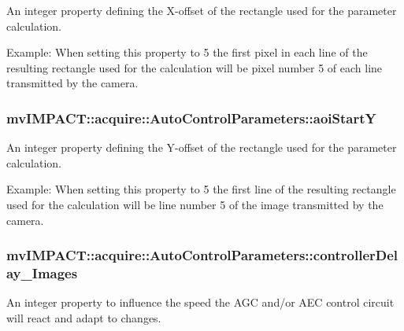 An integer property defining the X-\/offset of the rectangle used for the parameter calculation. 

Example\+: When setting this property to 5 the first pixel in each line of the resulting rectangle used for the calculation will be pixel number 5 of each line transmitted by the camera. \hypertarget{classmv_i_m_p_a_c_t_1_1acquire_1_1_auto_control_parameters_a58ded333b56e13a9924c20162556502c}{
\subsubsection[{aoi\+Start\+Y}]{ mv\+I\+M\+P\+A\+C\+T\+::acquire\+::\+Auto\+Control\+Parameters\+::aoi\+Start\+Y}}\label{classmv_i_m_p_a_c_t_1_1acquire_1_1_auto_control_parameters_a58ded333b56e13a9924c20162556502c}


An integer property defining the Y-\/offset of the rectangle used for the parameter calculation. 

Example\+: When setting this property to 5 the first line of the resulting rectangle used for the calculation will be line number 5 of the image transmitted by the camera. \hypertarget{classmv_i_m_p_a_c_t_1_1acquire_1_1_auto_control_parameters_a3407e03e305679114b266795ad777235}{
\subsubsection[{controller\+Delay\+\_\+\+Images}]{ mv\+I\+M\+P\+A\+C\+T\+::acquire\+::\+Auto\+Control\+Parameters\+::controller\+Delay\+\_\+\+Images}}\label{classmv_i_m_p_a_c_t_1_1acquire_1_1_auto_control_parameters_a3407e03e305679114b266795ad777235}


An integer property to influence the speed the A\+G\+C and/or A\+E\+C control circuit will react and adapt to changes. 

